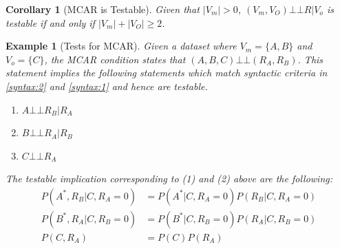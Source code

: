 \documentclass[12pt]{article}
\newcommand{\compos}{\mbox{$\bot\!\!\!\bot$}}
\newtheorem{example}{Example}
\newtheorem{cor}{Corollary}
\begin{document}
\begin{cor}[MCAR is Testable]\label{cor:mcar}
	Given that $|V_m|>0$, $(V_m, V_O) \compos R | V_o$ is testable if and only if $|V_m| + |V_O| \ge 2$.
\end{cor}

\begin{example}[Tests for MCAR] Given a dataset where $V_m=\{A,B\}$ and $V_o=\{C\}$, the MCAR condition states that $(A,B,C) \compos (R_A,R_B)$. This statement implies the following statements which match syntactic criteria in \ref{syntax:2} and \ref{syntax:1} and hence are testable. 
		\begin{enumerate}
			\item $A \compos R_B|R_A$ 
			\item $B \compos R_A|R_B$
			\item $C \compos R_A$
		\end{enumerate}
			The testable implication corresponding to (1) and (2) above are the following:
			\begin{align*}
			    			 P(A^*,R_B|C,R_A=0)&=P(A^*|C,R_A=0)P(R_B|C,R_A=0) \\
			    			 P(B^*,R_A|C,R_B=0)&=P(B^*|C,R_B=0)P(R_A|C,R_B=0)\\
			    			 P(C,R_A)&=P(C)P(R_A)
			\end{align*}
\end{example}
\end{document}
